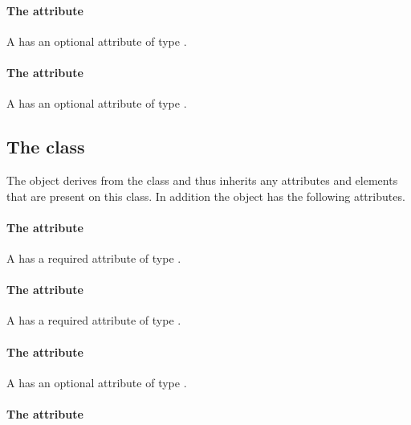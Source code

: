 \paragraph{The \fixttspace{} attribute}

A \ColorDefinition has an optional attribute  of type
.

\paragraph{The \fixttspace{} attribute}

A \ColorDefinition has an optional attribute  of type
.

\subsection{The  class}
\label{renderellipse-class}


The \RenderEllipse object derives from the 
class and thus inherits any attributes and elements that are present on
this class.
In addition the \RenderEllipse object has the following attributes.

\paragraph{The \fixttspace{} attribute}

A \RenderEllipse has a required attribute  of type
\RelAbsVector.

\paragraph{The \fixttspace{} attribute}

A \RenderEllipse has a required attribute  of type
\RelAbsVector.

\paragraph{The \fixttspace{} attribute}

A \RenderEllipse has an optional attribute  of type
\RelAbsVector.

\paragraph{The \fixttspace{} attribute}

